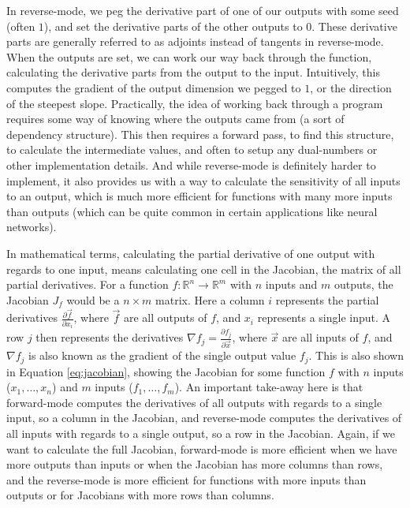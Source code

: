         In reverse-mode, we peg the derivative part of one of our outputs with some seed (often $1$), and set the derivative parts of the other outputs to $0$.
        These derivative parts are generally referred to as adjoints instead of tangents in reverse-mode.
        When the outputs are set, we can work our way back through the function, calculating the derivative parts from the output to the input.
        Intuitively, this computes the gradient of the output dimension we pegged to $1$, or the direction of the steepest slope.
        Practically, the idea of working back through a program requires some way of knowing where the outputs came from (a sort of dependency structure).
        This then requires a forward pass, to find this structure, to calculate the intermediate values, and often to setup any dual-numbers or other implementation details.
        And while reverse-mode is definitely harder to implement, it also provides us with a way to calculate the sensitivity of all inputs to an output, which is much more efficient for functions with many more inputs than outputs (which can be quite common in certain applications like neural networks).

        In mathematical terms, calculating the partial derivative of one output with regards to one input, means calculating one cell in the Jacobian, the matrix of all partial derivatives.
        For a function $f:\mathbb{R}^n\to\mathbb{R}^m$ with $n$ inputs and $m$ outputs, the Jacobian $J_f$ would be a $n\times m$ matrix.
        Here a column $i$ represents the partial derivatives $\tfrac{\partial\vec{f}}{\partial x_i}$, where $\vec{f}$ are all outputs of $f$, and $x_i$ represents a single input.
        A row $j$ then represents the derivatives $\nabla f_j=\tfrac{\partial f_j}{\partial\vec{x}}$, where $\vec{x}$ are all inputs of $f$, and $\nabla f_j$ is also known as the gradient of the single output value $f_j$.
        This is also shown in Equation \ref{eq:jacobian}, showing the Jacobian for some function $f$ with $n$ inputs ($x_1,\dots,x_n$) and $m$ inputs ($f_1,\dots,f_m$).
        An important take-away here is that forward-mode computes the derivatives of all outputs with regards to a single input, so a column in the Jacobian, and reverse-mode computes the derivatives of all inputs with regards to a single output, so a row in the Jacobian.
        Again, if we want to calculate the full Jacobian, forward-mode is more efficient when we have more outputs than inputs or when the Jacobian has more columns than rows, and the reverse-mode is more efficient for functions with more inputs than outputs or for Jacobians with more rows than columns.

